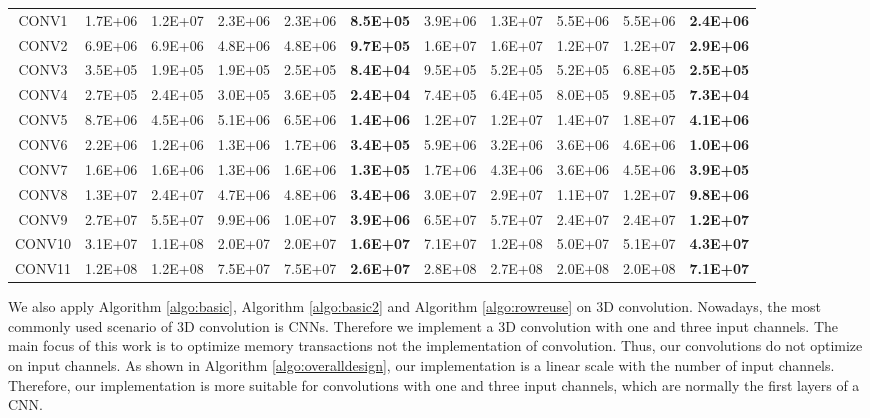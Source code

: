\documentclass[sigplan,review,anonymous]{acmart}\settopmatter{printfolios=true,printccs=false,printacmref=false}
\begin{document}
\begin{table}[]
\begin{tabular}{c|ccccc|ccccc}
CONV1& 1.7E+06& 1.2E+07& 2.3E+06& 2.3E+06& \textbf{8.5E+05}& 3.9E+06& 1.3E+07& 5.5E+06& 5.5E+06& \textbf{2.4E+06}\\
CONV2& 6.9E+06& 6.9E+06& 4.8E+06& 4.8E+06& \textbf{9.7E+05}& 1.6E+07& 1.6E+07& 1.2E+07& 1.2E+07& \textbf{2.9E+06}\\
CONV3& 3.5E+05& 1.9E+05& 1.9E+05& 2.5E+05& \textbf{8.4E+04}& 9.5E+05& 5.2E+05& 5.2E+05& 6.8E+05& \textbf{2.5E+05}\\
CONV4& 2.7E+05& 2.4E+05& 3.0E+05& 3.6E+05& \textbf{2.4E+04}& 7.4E+05& 6.4E+05& 8.0E+05& 9.8E+05& \textbf{7.3E+04}\\
CONV5& 8.7E+06& 4.5E+06& 5.1E+06& 6.5E+06& \textbf{1.4E+06}& 1.2E+07& 1.2E+07& 1.4E+07& 1.8E+07& \textbf{4.1E+06}\\
CONV6& 2.2E+06& 1.2E+06& 1.3E+06& 1.7E+06& \textbf{3.4E+05}& 5.9E+06& 3.2E+06& 3.6E+06& 4.6E+06& \textbf{1.0E+06}\\
CONV7& 1.6E+06& 1.6E+06& 1.3E+06& 1.6E+06& \textbf{1.3E+05}& 1.7E+06& 4.3E+06& 3.6E+06& 4.5E+06& \textbf{3.9E+05}\\
CONV8& 1.3E+07& 2.4E+07& 4.7E+06& 4.8E+06& \textbf{3.4E+06}& 3.0E+07& 2.9E+07& 1.1E+07& 1.2E+07& \textbf{9.8E+06}\\
CONV9& 2.7E+07& 5.5E+07& 9.9E+06& 1.0E+07& \textbf{3.9E+06}& 6.5E+07& 5.7E+07& 2.4E+07& 2.4E+07& \textbf{1.2E+07}\\
CONV10& 3.1E+07& 1.1E+08& 2.0E+07& 2.0E+07& \textbf{1.6E+07}& 7.1E+07& 1.2E+08& 5.0E+07& 5.1E+07& \textbf{4.3E+07}\\
CONV11& 1.2E+08& 1.2E+08& 7.5E+07& 7.5E+07& \textbf{2.6E+07}& 2.8E+08& 2.7E+08& 2.0E+08& 2.0E+08& \textbf{7.1E+07}\\ \hline
\end{tabular}
\end{table}

We also apply Algorithm \ref{algo:basic}, Algorithm \ref{algo:basic2} and Algorithm \ref{algo:rowreuse} on 3D convolution. Nowadays, the most commonly used scenario of 3D convolution is CNNs. Therefore we implement a 3D convolution with one and three input channels. The main focus of this work is to optimize memory transactions not the implementation of convolution. Thus, our convolutions do not optimize on input channels. As shown in Algorithm \ref{algo:overalldesign}, our implementation is a linear scale with the number of input channels. Therefore, our implementation is more suitable for convolutions with one and three input channels, which are normally the first layers of a CNN.
\end{document}
